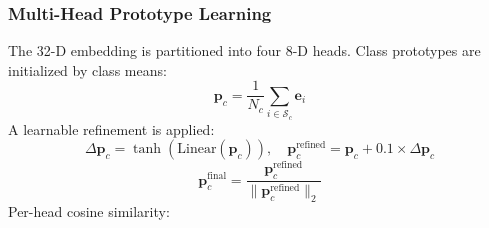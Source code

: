 \documentclass[10pt,letterpaper]{article}
\begin{document}
                                                                                                                 \subsubsection*{\textbf{Multi-Head Prototype Learning}}
                                                                                                                 The 32-D embedding is partitioned into four 8-D heads. Class prototypes are initialized by class means:
                                                                                                                 \begin{equation} \label{eq_rob:14}
                                                                                                                 \mathbf{p}_c = \frac{1}{N_c}\sum_{i\in\mathcal{S}_c}\mathbf{e}_i
                                                                                                                 \end{equation}
                                                                                                                 A learnable refinement is applied:
                                                                                                                 \begin{equation} \label{eq_rob:15}
                                                                                                                 \Delta \mathbf{p}_c = \tanh\left(\text{Linear}(\mathbf{p}_c)\right),\quad
                                                                                                                 \mathbf{p}_c^{\text{refined}} = \mathbf{p}_c + 0.1\times \Delta \mathbf{p}_c
                                                                                                                 \end{equation}
                                                                                                                 \begin{equation} \label{eq_rob:16}
                                                                                                                 \mathbf{p}_c^{\text{final}} = \frac{\mathbf{p}_c^{\text{refined}}}{\|\mathbf{p}_c^{\text{refined}}\|_2}
                                                                                                                 \end{equation}
                                                                                                                 Per-head cosine similarity:
\end{document}
